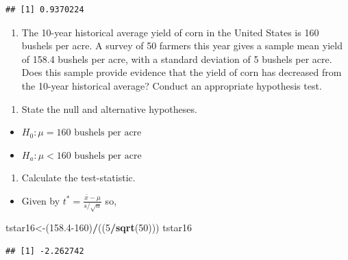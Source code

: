 \documentclass[
  openany]{book}
\newenvironment{Shaded}{\begin{snugshade}}{\end{snugshade}}
\newcommand{\DecValTok}[1]{\textcolor[rgb]{0.00,0.00,0.81}{#1}}
\newcommand{\FloatTok}[1]{\textcolor[rgb]{0.00,0.00,0.81}{#1}}
\newcommand{\FunctionTok}[1]{\textcolor[rgb]{0.13,0.29,0.53}{\textbf{#1}}}
\newcommand{\NormalTok}[1]{#1}
\newcommand{\OtherTok}[1]{\textcolor[rgb]{0.56,0.35,0.01}{#1}}
\newcommand{\SpecialCharTok}[1]{\textcolor[rgb]{0.81,0.36,0.00}{\textbf{#1}}}
\providecommand{\tightlist}{%
  \setlength{\itemsep}{0pt}\setlength{\parskip}{0pt}}
\begin{document}
\begin{verbatim}
## [1] 0.9370224
\end{verbatim}

\begin{enumerate}
\def\labelenumi{\arabic{enumi}.}
\setcounter{enumi}{15}
\tightlist
\item
  The 10-year historical average yield of corn in the United States is 160 bushels per acre. A survey of 50 farmers this year gives a sample mean yield of 158.4 bushels per acre, with a standard deviation of 5 bushels per acre. Does this sample provide evidence that the yield of corn has decreased from the 10-year historical average? Conduct an appropriate hypothesis test.
\end{enumerate}

\begin{enumerate}
\def\labelenumi{\alph{enumi}.}
\tightlist
\item
  State the null and alternative hypotheses.
\end{enumerate}

\begin{itemize}
\tightlist
\item
  \(H_0: \mu = 160 \text{ bushels per acre}\)
\item
  \(H_a: \mu < 160 \text{ bushels per acre}\)
\end{itemize}

\begin{enumerate}
\def\labelenumi{\alph{enumi}.}
\setcounter{enumi}{1}
\tightlist
\item
  Calculate the test-statistic.
\end{enumerate}

\begin{itemize}
\tightlist
\item
  Given by \(t^* = \frac{\bar{x}-\mu}{s/\sqrt{n}}\) so,
\end{itemize}

\begin{Shaded}
\begin{Highlighting}[]
\NormalTok{tstar16}\OtherTok{\textless{}{-}}\NormalTok{(}\FloatTok{158.4}\DecValTok{{-}160}\NormalTok{)}\SpecialCharTok{/}\NormalTok{((}\DecValTok{5}\SpecialCharTok{/}\FunctionTok{sqrt}\NormalTok{(}\DecValTok{50}\NormalTok{)))}
\NormalTok{tstar16}
\end{Highlighting}
\end{Shaded}

\begin{verbatim}
## [1] -2.262742
\end{verbatim}
\end{document}
